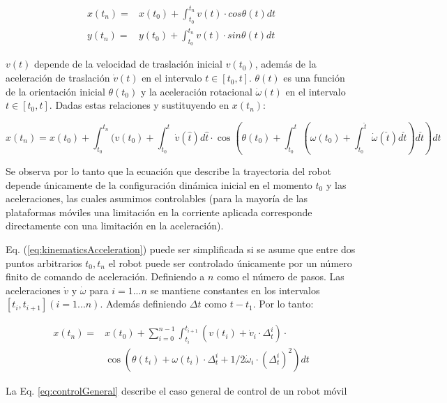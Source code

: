 \documentclass[12pt]{article}
\begin{document}
\begin{align}
	x(t_n) = 
		& x(t_0) + \int_{t_0}^{t_n} v(t) \cdot cos\theta(t) dt
	\\
	y(t_n) = 
		& y(t_0) + \int_{t_0}^{t_n} v(t) \cdot sin\theta(t) dt
\end{align}

$v(t)$ depende de la velocidad de traslación inicial $v(t_0)$, además de la aceleración de traslación $\dot{v}(t)$ en el intervalo $t \in [t_0, t]$. $\theta(t)$ es una función de la orientación inicial $\theta(t_0)$ y la aceleración rotacional $\dot{\omega}(t)$ en el intervalo $t \in [t_0, t]$. Dadas estas relaciones y sustituyendo en $x(t_n)$:

\begin{equation}
\label{eq:kinematicsAcceleration}
	x(t_n) = x(t_0) 
		+ \int_{t_0}^{t_n}(v(t_0) + \int_{t_0}^{t} \dot{v}(\hat{t})d\hat{t}
		\cdot \cos (\theta(t_0) + \int_{t_0}^{t}(\omega(t_0) + \int_{t_0}^{\check{t}}\dot{\omega}(\check{t})d\check{t})d\check{t})dt
\end{equation}

Se observa por lo tanto que la ecuación que describe la trayectoria del robot depende únicamente de la configuración dinámica inicial en el momento $t_0$ y las aceleraciones, las cuales asumimos controlables (para la mayoría de las plataformas móviles una limitación en la corriente aplicada corresponde directamente con una limitación en la aceleración).

Eq. (\ref{eq:kinematicsAcceleration}) puede ser simplificada si se asume que entre dos puntos arbitrarios $t_0, t_n$ el robot puede ser controlado únicamente por un número finito de comando de aceleración. Definiendo a $n$ como el número de pasos. Las aceleraciones $\dot{v}$ y $\dot{\omega}$ para $i = 1...n$ se mantiene constantes en los intervalos $[t_i, t_{i+1}](i=1...n)$. Además definiendo $\Delta t$ como $t - t_1$. Por lo tanto:

\begin{equation}
\label{eq:controlGeneral}
\begin{aligned}
	x(t_n) = &
		x(t_0) + \sum_{i=0}^{n-1} \int_{t_i}^{t_{i+1}} (v(t_i) + \dot{v}_i \cdot \Delta_t^i) \cdot 
		\\ &
		\cos (\theta(t_i) + \omega(t_i)\cdot\Delta_t^i + 1/2 \dot{\omega}_i \cdot (\Delta_t^i)^2) dt
\end{aligned}
\end{equation}

La Eq. \ref{eq:controlGeneral} describe el caso general de control de un robot móvil
\end{document}
